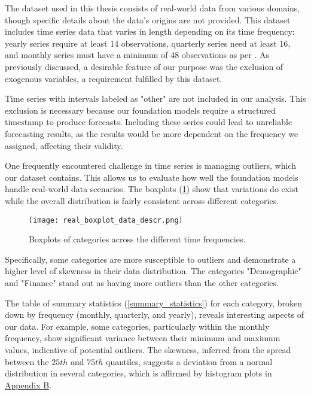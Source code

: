 \documentclass[12pt,a4paper]{article}
\begin{document}
The dataset used in this thesis consists of real-world data from various domains, though specific details about the data's origins are not provided. This dataset includes time series data that varies in length depending on its time frequency: yearly series require at least 14 observations, quarterly series need at least 16, and monthly series must have a minimum of 48 observations as per \cite{MAKRIDAKIS2000}. As previously discussed, a desirable feature of our purpose was the exclusion of exogenous variables, a requirement fulfilled by this dataset. 

Time series with intervals labeled as "other" are not included in our analysis. This exclusion is necessary because our foundation models require a structured timestamp to produce forecasts. Including these series could lead to unreliable forecasting results, as the results would be more dependent on the frequency we assigned, affecting their validity. 

One frequently encountered challenge in time series is managing outliers, which our dataset contains. This allows us to evaluate how well the foundation models handle real-world data scenarios. The boxplots (\ref{boxplot_data_distribution}) show that variations do exist while the overall distribution is fairly consistent across different categories. 

\begin{figure}[htbp]
  \centering
  \texttt{[image: real\_boxplot\_data\_descr.png]}
  \caption{Boxplots of categories across the different time frequencies.}
  \label{boxplot_data_distribution}
\end{figure}

Specifically, some categories are more susceptible to outliers and demonstrate a higher level of skewness in their data distribution. The categories "Demographic" and "Finance" stand out as having more outliers than the other categories.

The table of summary statistics (\ref{summary_statistics}) for each category, broken down by frequency (monthly, quarterly, and yearly), reveals interesting aspects of our data. For example, some categories, particularly within the monthly frequency, show significant variance between their minimum and maximum values, indicative of potential outliers. The skewness, inferred from the spread between the $25th$ and $75th$ quantiles, suggests a deviation from a normal distribution in several categories, which is affirmed by histogram plots in \hyperref[appendix_b]{Appendix B}. 
\end{document}
